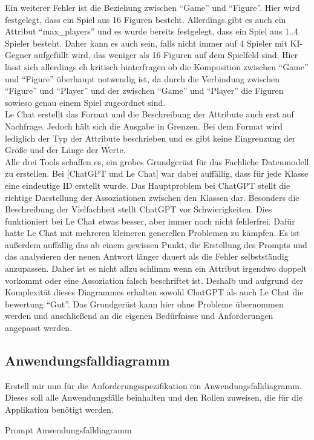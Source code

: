 Ein weiterer Fehler ist die Beziehung zwischen ``Game'' und ``Figure''. Hier wird festgelegt, dass ein Spiel aus 16 Figuren besteht. Allerdings gibt es auch ein 
Attribut ``max\_players'' und es wurde bereits festgelegt, dass ein Spiel aus 1..4 Spieler besteht. Daher kann es auch sein, falls nicht immer auf 4 Spieler mit KI-Gegner aufgefüllt 
wird, das weniger als 16 Figuren auf dem Spielfeld sind. Hier lässt sich allerdings eh kritisch hinterfragen ob die Komposition zwischen ``Game'' und ``Figure'' überhaupt 
notwendig ist, da durch die Verbindung zwischen ``Figure'' und ``Player'' und der zwischen ``Game'' und ``Player'' die Figuren sowieso genau einem Spiel zugeordnet sind.\\
Le Chat erstellt das Format und die Beschreibung der Attribute auch erst auf Nachfrage. Jedoch hält sich die Ausgabe in Grenzen. Bei dem Format wird lediglich der Typ der
Attribute beschrieben und es gibt keine Eingrenzung der Größe und der Länge der Werte.\\

Alle drei Tools schaffen es, ein grobes Grundgerüst für das Fachliche Datenmodell zu erstellen. Bei [ChatGPT und Le Chat] war dabei auffällig, dass für jede Klasse eine 
eindeutige ID erstellt wurde. Das Hauptproblem bei ChatGPT stellt die richtige Darstellung der Assoziationen zwischen den Klassen dar. Besonders die Beschreibung der 
Vielfachheit stellt ChatGPT vor Schwierigkeiten. Dies funktioniert bei Le Chat etwas besser, aber immer noch nicht fehlerfrei. Dafür hatte Le Chat mit mehreren kleineren 
generellen Problemen zu kämpfen. Es ist außerdem auffällig das ab einem gewissen Punkt, die Erstellung des Prompts und das analysieren der neuen Antwort länger dauert als 
die Fehler selbstständig anzupassen. Daher ist es nicht allzu schlimm wenn ein Attribut irgendwo doppelt vorkommt oder eine Assoziation falsch beschriftet ist. Deshalb und
aufgrund der Komplexität dieses Diagrammes erhalten sowohl ChatGPT als auch Le Chat die bewertung ``Gut''. Das Grundgerüst kann hier ohne Probleme übernommen werden und 
anschließend an die eigenen Bedürfnisse und Anforderungen angepasst werden. 


\subsection*{Anwendungsfalldiagramm}

\begin{prompt}[H]
    \begin{tcolorbox}[colback=gray!20, colframe=gray!20, boxrule=0pt, sharp corners] 
        Erstell mir nun für die Anforderungsspezifikation ein Anwendungsfalldiagramm. Dieses soll alle Anwendungsfälle beinhalten und den Rollen zuweisen, die für die 
        Applikation benötigt werden.
        \vfill
    \end{tcolorbox}
    \caption{Prompt Anwendungsfalldiagramm}
    \label{Prompt Anwendungsfalldiagramm}
\end{prompt}

